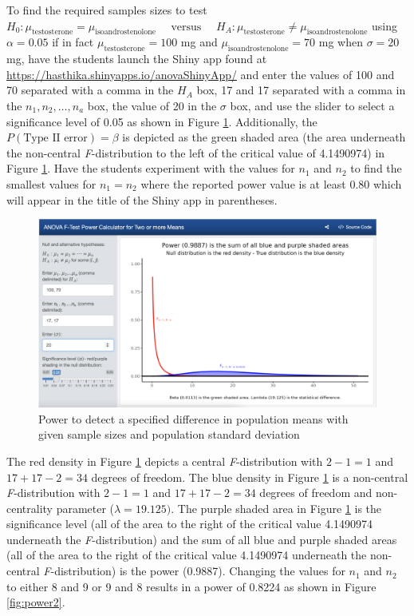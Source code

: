\documentclass[
]{article}
\begin{document}
To find the required samples sizes to test \(H_0: \mu_\text{testosterone} = \mu_\text{isoandrostenolone}\quad\text{ versus }\quad H_A: \mu_\text{testosterone} \neq \mu_\text{isoandrostenolone}\) using \(\alpha = 0.05\) if in fact \(\mu_\text{testosterone} = 100\) mg and \(\mu_\text{isoandrostenolone} = 70\) mg when \(\sigma = 20\) mg, have the students launch the Shiny app found at \url{https://hasthika.shinyapps.io/anovaShinyApp/} and enter the values of 100 and 70 separated with a comma in the \(H_A\) box, 17 and 17 separated with a comma in the \(n_1, n_2,\ldots, n_a\) box, the value of 20 in the \(\sigma\) box, and use the slider to select a significance level of 0.05 as shown in Figure \ref{fig:power1}. Additionally, the \(P(\text{Type II error}) = \beta\) is depicted as the green shaded area (the area underneath the non-central \emph{F}-distribution to the left of the critical value of 4.1490974) in Figure \ref{fig:power1}. Have the students experiment with the values for \(n_1\) and \(n_2\) to find the smallest values for \(n_1 = n_2\) where the reported power value is at least 0.80 which will appear in the title of the Shiny app in parentheses.

\begin{figure}

{\centering \includegraphics[width=5.96in]{./pics/fig-power1a} 

}

\caption{Power to detect a specified difference in population means with given sample sizes and population standard deviation}\label{fig:power1}
\end{figure}

The red density in Figure \ref{fig:power1} depicts a central \emph{F}-distribution with \(2 - 1 = 1\) and \(17 + 17 - 2 = 34\) degrees of freedom. The blue density in Figure \ref{fig:power1} is a non-central \emph{F}-distribution with \(2-1 = 1\) and \(17 + 17 - 2 = 34\) degrees of freedom and non-centrality parameter (\(\lambda = 19.125)\). The purple shaded area in Figure \ref{fig:power1} is the significance level (all of the area to the right of the critical value 4.1490974 underneath the \emph{F}-distribution) and the sum of all blue and purple shaded areas (all of the area to the right of the critical value 4.1490974 underneath the non-central \emph{F}-distribution) is the power (0.9887). Changing the values for \(n_1\) and \(n_2\) to either 8 and 9 or 9 and 8 results in a power of 0.8224 as shown in Figure \ref{fig:power2}.
\end{document}
